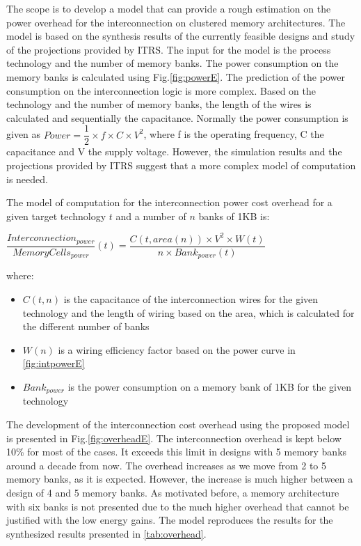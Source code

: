  The scope is to develop a model that can provide a rough estimation on the power overhead for the interconnection on clustered memory architectures.
 The model is based on the synthesis results of the currently feasible designs and study of the projections provided by ITRS.
 The input for the model is the process technology and the number of memory banks.
 The power consumption on the memory banks is calculated using Fig.\ref{fig:powerE}.
  The prediction of the power consumption on the interconnection logic is more complex.
 Based on the technology and the number of memory banks, the length of the wires is calculated and sequentially the capacitance.
 Normally the power consumption is given as  $Power = \dfrac{1}{2} \times f \times C \times V^{2} $, where  f is the operating frequency, C the capacitance and V the supply voltage.
 However, the simulation results and the projections provided by ITRS suggest that a more complex model of computation is needed.
 
 The model of computation for the interconnection power cost overhead for a given target technology $ t $ and a number of $ n $ banks of 1KB  is:
 
 \begin{center}
 $ \dfrac{Interconnection_{power}}{MemoryCells_{power}}(t) = \dfrac{C(t,area(n)) \times V^{2} \times W(t) }{n \times Bank_{power}(t)} $ 
  \end{center}
  
 where:

 \begin{itemize}
 \item $C(t,n)$ is the capacitance of the interconnection wires for the given technology and the length of wiring based on the area, which is calculated for the different number of banks
 \item $ W(n) $ is a wiring efficiency factor based on the power curve in \ref{fig:intpowerE}
 \item $ Bank_{power} $ is the power consumption on a memory bank of 1KB for the given technology
 \end{itemize}
 
 The development of the interconnection cost overhead using the proposed model is presented in Fig.\ref{fig:overheadE}.
 The interconnection overhead is kept below 10\% for most of the cases.
 It exceeds this limit in designs with 5 memory banks around a decade from now.
 The overhead increases as we move from 2 to 5 memory banks, as it is expected.
 However, the increase is much higher between a design of 4 and 5 memory banks.
 As motivated before, a memory architecture with six banks is not presented due to the much higher overhead that cannot be justified with the low energy gains.
 The model reproduces the results for the synthesized results presented in \ref{tab:overhead}.
 
